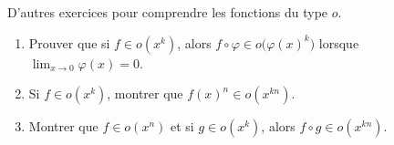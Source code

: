 
\begin{exercice}\label{exoDevel0009}

D'autres exercices pour comprendre les fonctions du type $o$.

\begin{enumerate}

\item
Prouver que si $f\in o(x^k)$, alors $f\circ\varphi\in o\big( \varphi(x)^k \big)$ lorsque $\lim_{x\to 0} \varphi(x)=0$.

\item
Si $f\in o(x^k)$, montrer que $f(x)^n\in o(x^{kn})$.

\item
Montrer que  $f\in o(x^n)$ et si $g\in o(x^k)$, alors $f\circ g\in o(x^{kn})$.

\end{enumerate}


\end{exercice}
